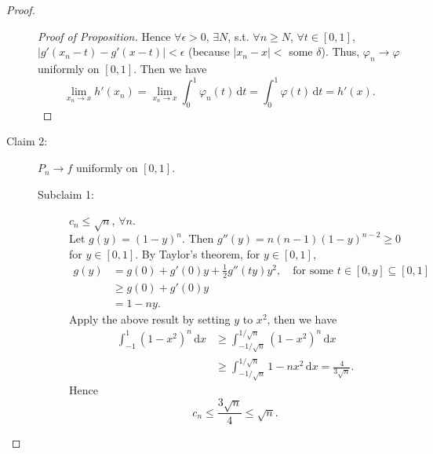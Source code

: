 \documentclass[12pt]{article}
\theoremstyle{plain}
\theoremstyle{definition}
\begin{document}
\begin{proof}
\begin{description}
\begin{proof}[Proof of Proposition]
            Hence $\forall \epsilon>0$, $\exists N$, s.t. $\forall n\geq N$,
            $\forall t\in[0,1]$, $|g'(x_n-t)-g'(x-t)|<\epsilon$ (because
            $|x_n-x|<$ some $\delta$).
            Thus, $\varphi_n\rightarrow\varphi$ uniformly on $[0,1]$.
            Then we have
            $$\lim_{x_n\rightarrow x}h'(x_n)
            =\lim_{x_n\rightarrow x}\int_0^1\varphi_n(t)\,\mathrm{d}t=
            \int_0^1\varphi(t)\,\mathrm{d}t
            =h'(x).$$
        \end{proof}
        \item[Claim 2:] $P_n\rightarrow f$ uniformly on $[0,1]$.
            \begin{description}
                \item[Subclaim 1:] $c_n\leq\sqrt{n}$, $\forall n$.\\
                Let $g(y)=(1-y)^n$.
                Then $g''(y)=n(n-1)(1-y)^{n-2}\geq0$ for $y\in[0,1]$.
                By Taylor's theorem, for $y\in[0,1]$, 
                $$\begin{aligned}
                    g(y)&=g(0)+g'(0)y+\frac{1}{2}g''(ty)y^2,\quad \text{for some
                }t\in[0,y]\subseteq[0,1]\\
                    &\geq g(0)+g'(0)y\\
                    &=1-ny.
                \end{aligned}$$
                Apply the above result by setting $y$ to $x^2$, then we have
                $$\begin{aligned}
                    \int_{-1}^1(1-x^2)^n\,\mathrm{d}x
                    &\geq\int_{-1/\sqrt{n}}^{1/\sqrt{n}}(1-x^2)^n\,\mathrm{d}x\\
                    &\geq\int_{-1/\sqrt{n}}^{1/\sqrt{n}}1-nx^2\,\mathrm{d}x
                    =\frac{4}{3\sqrt{n}}.
                \end{aligned}$$
                Hence
                $$c_n\leq \frac{3\sqrt{n}}{4}\leq\sqrt{n}.$$


\end{description}
\end{description}
\end{proof}
\end{document}
